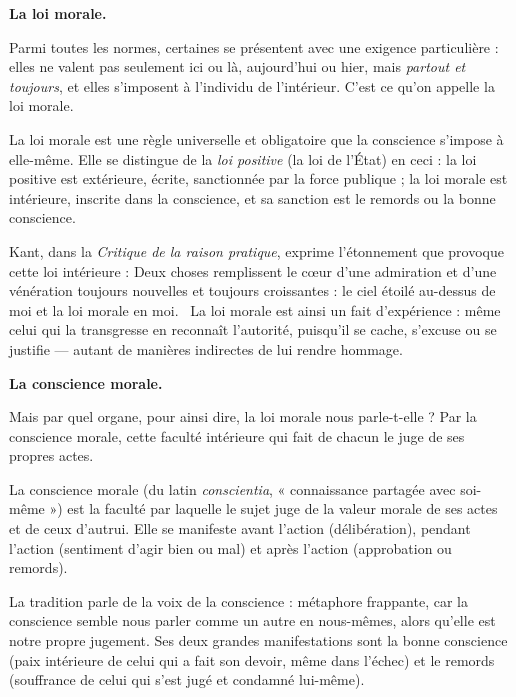 \documentclass[11pt]{article}
\newcommand{\cle}[1]{{\popxbold\color{popdark}#1}}
\begin{document}
\textbf{La loi morale.}\par
Parmi toutes les normes, certaines se présentent avec une exigence particulière : elles ne valent pas seulement ici ou là, aujourd'hui ou hier, mais \emph{partout et toujours}, et elles s'imposent à l'individu de l'intérieur. C'est ce qu'on appelle la \cle{loi morale}.

\begin{definition}
La \cle{loi morale} est une règle universelle et obligatoire que la conscience s'impose à elle-même. Elle se distingue de la \emph{loi positive} (la loi de l'État) en ceci : la loi positive est extérieure, écrite, sanctionnée par la force publique ; la loi morale est intérieure, inscrite dans la conscience, et sa sanction est le remords ou la bonne conscience.
\end{definition}

Kant, dans la \emph{Critique de la raison pratique}, exprime l'étonnement que provoque cette loi intérieure : \guillemotleft Deux choses remplissent le cœur d'une admiration et d'une vénération toujours nouvelles et toujours croissantes : le ciel étoilé au-dessus de moi et la loi morale en moi. \guillemotright\ La loi morale est ainsi un fait d'expérience : même celui qui la transgresse en reconnaît l'autorité, puisqu'il se cache, s'excuse ou se justifie — autant de manières indirectes de lui rendre hommage.

\textbf{La conscience morale.}\par
Mais par quel organe, pour ainsi dire, la loi morale nous parle-t-elle ? Par la \cle{conscience morale}, cette faculté intérieure qui fait de chacun le juge de ses propres actes.

\begin{definition}
La \cle{conscience morale} (du latin \emph{conscientia}, « connaissance partagée avec soi-même ») est la faculté par laquelle le sujet juge de la valeur morale de ses actes et de ceux d'autrui. Elle se manifeste avant l'action (délibération), pendant l'action (sentiment d'agir bien ou mal) et après l'action (approbation ou remords).
\end{definition}

La tradition parle de la \guillemotleft voix de la conscience \guillemotright : métaphore frappante, car la conscience semble nous parler comme un autre en nous-mêmes, alors qu'elle est notre propre jugement. Ses deux grandes manifestations sont la \cle{bonne conscience} (paix intérieure de celui qui a fait son devoir, même dans l'échec) et le \cle{remords} (souffrance de celui qui s'est jugé et condamné lui-même).
\end{document}
